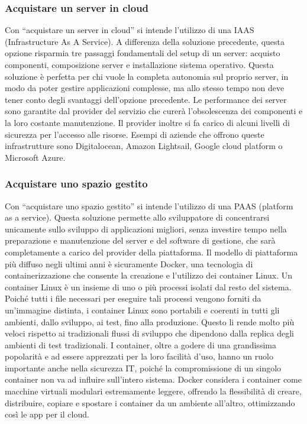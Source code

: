 \documentclass[12pt,a4paper]{article}
\begin{document}
\subsubsection{Acquistare un server in cloud}
Con “acquistare un server in cloud” si intende l’utilizzo di una IAAS (Infrastructure As A Service). A differenza della soluzione precedente, questa opzione risparmia tre passaggi fondamentali del setup di un server: acquisto componenti, composizione server e installazione sistema operativo.
Questa soluzione è perfetta per chi vuole la completa autonomia sul proprio server, in modo da poter gestire applicazioni complesse, ma allo stesso tempo non deve tener conto degli svantaggi dell’opzione precedente. Le performance dei server sono garantite dal provider del servizio che curerà l’obsolescenza dei componenti e la loro costante manutenzione. Il provider inoltre si fa carico di alcuni livelli di sicurezza per l’accesso alle risorse. Esempi di aziende che offrono queste infrastrutture sono Digitalocean, Amazon Lightsail, Google cloud platform o Microsoft Azure.

\subsubsection{Acquistare uno spazio gestito}
Con “acquistare uno spazio gestito” si intende l’utilizzo di una PAAS (platform as a service). Questa soluzione permette allo sviluppatore di concentrarsi unicamente sullo sviluppo di applicazioni migliori, senza investire tempo nella preparazione e manutenzione del server e del software di gestione, che sarà completamente a carico del provider della piattaforma.
Il modello di piattaforma più diffuso negli ultimi anni è sicuramente Docker, una tecnologia di containerizzazione che consente la creazione e l'utilizzo dei container Linux.
Un container Linux è un insieme di uno o più processi isolati dal resto del sistema. Poiché tutti i file necessari per eseguire tali processi vengono forniti da un'immagine distinta, i container Linux sono portabili e coerenti in tutti gli ambienti, dallo sviluppo, ai test, fino alla produzione. Questo li rende molto più veloci rispetto ai tradizionali flussi di sviluppo che dipendono dalla replica degli ambienti di test tradizionali. I container, oltre a godere di una grandissima popolarità e ad essere apprezzati per la loro facilità d'uso, hanno un ruolo importante anche nella sicurezza IT, poiché la compromissione di un singolo container non va ad influire sull’intero sistema.
Docker considera i container come macchine virtuali modulari estremamente leggere, offrendo la flessibilità di creare, distribuire, copiare e spostare i container da un ambiente all'altro, ottimizzando così le app per il cloud.
\end{document}
